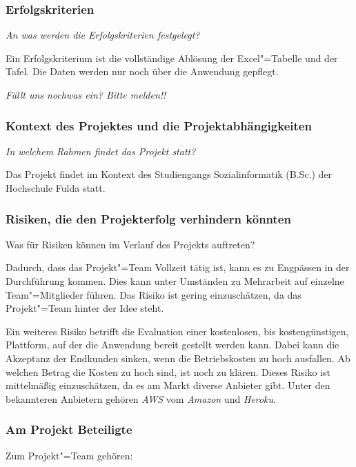 \subsubsection{Erfolgskriterien}

\textit{An was werden die Erfolgskriterien festgelegt?}

Ein Erfolgskriterium ist die vollständige Ablösung der Excel"=Tabelle und der Tafel. Die Daten werden nur noch über die Anwendung gepflegt.

\textit{Fällt uns nochwas ein? Bitte melden!!}


\subsubsection{Kontext des Projektes und die Projektabhängigkeiten}

\textit{In welchem Rahmen findet das Projekt statt?}

Das Projekt findet im Kontext des Studiengangs Sozialinformatik (B.Sc.) der Hochschule Fulda statt.

\subsubsection{Risiken, die den Projekterfolg verhindern könnten}

Was für Risiken können im Verlauf des Projekts auftreten?

Dadurch, dass das Projekt"=Team Vollzeit tätig ist, kann es zu Engpässen in der Durchführung kommen. Dies kann unter Umständen zu Mehrarbeit auf einzelne Team"=Mitglieder führen. Das Risiko ist gering einzuschätzen, da das Projekt"=Team  hinter der Idee steht.

Ein weiteres Risiko betrifft die Evaluation einer kostenlosen, bis kostengünstigen, Plattform, auf der die Anwendung bereit gestellt werden kann. Dabei kann die Akzeptanz der Endkunden sinken, wenn die Betriebskosten zu hoch ausfallen. Ab welchen Betrag die Kosten zu hoch sind, ist noch zu klären. Dieses Risiko ist mittelmäßig einzuschätzen, da es am Markt diverse Anbieter gibt. Unter den bekannteren Anbietern gehören \textit{AWS} vom \textit{Amazon} und \textit{Heroku}.

\subsubsection{Am Projekt Beteiligte}\label{sec:beteiligte}

Zum Projekt"=Team gehören:

